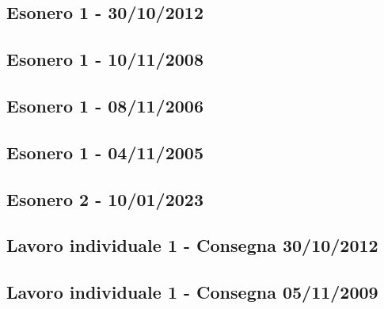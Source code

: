 \newpage

\subsection{Esonero 1 - 30/10/2012}


\newpage

\subsection{Esonero 1 - 10/11/2008}


\newpage

\subsection{Esonero 1 - 08/11/2006}



\newpage

\subsection{Esonero 1 - 04/11/2005}


\newpage
\subsection{Esonero 2 - 10/01/2023}


\newpage

\subsection{Lavoro individuale 1 - Consegna 30/10/2012}


\newpage

\subsection{Lavoro individuale 1 - Consegna 05/11/2009}


